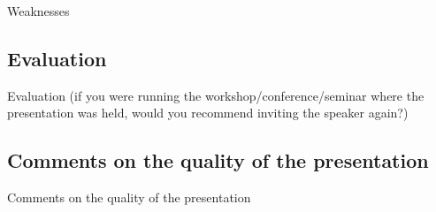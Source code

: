 \documentclass[a4paper]{article}
\begin{document}
Weaknesses

\subsection{Evaluation}

Evaluation (if you were running the workshop/conference/seminar where the presentation was held, would you recommend inviting the speaker again?)

\subsection{Comments on the quality of the presentation}

Comments on the quality of the presentation


 
\end{document}
